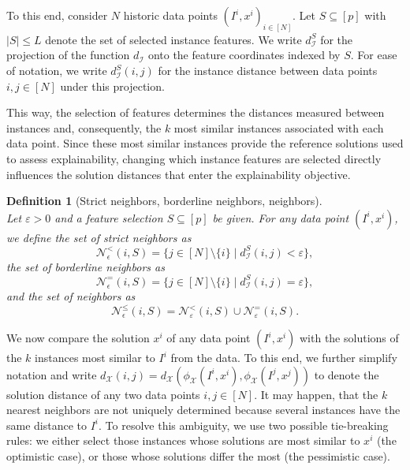 \documentclass[11pt, a4paper]{article}
\newtheorem{definition}{Definition}
\newcommand{\MHil}[1]{\todo[color=gray, textcolor=yellow, inline, author=MH]{#1}}
\newcommand{\I}{{\mathcal{I}}} %
\newcommand{\X}{{\mathcal{X}}} %
\newcommand{\instanceindex}{i}
\newcommand{\fsel}{S} %
\newcommand{\selectionset}{\fsel}
\newcommand{\neighbour}{\ensuremath{\mathcal{N}}}
\newcommand{\sEpsStrict}[1][(\instanceindex,\selectionset)]{\ensuremath{\neighbour^<_\epsilon#1}}
\newcommand{\sEpsBorder}[1][(\instanceindex,\selectionset)]{\ensuremath{\neighbour^=_\epsilon#1}}
\newcommand{\sEpsNeighbour}[1][(\instanceindex,\selectionset)]{\ensuremath{\neighbour^\le_\epsilon#1}}
\newcommand{\sEps}[1][(\instanceindex,\selectionset)]{\ensuremath{\neighbour_\epsilon#1}}
\begin{document}
To this end, consider $N$ historic data points $(I^i, x^i)_{i \in [N]}$. Let $\selectionset \subseteq [p]$ with $|\selectionset| \leq L$ denote the set of selected instance features. We write $d_{\mathcal{I}}^{\selectionset}$ for the projection of the function $d_{\mathcal{I}}$ onto the feature coordinates indexed by $\selectionset$. For ease of notation, we write $d_\I^{\selectionset}(i,j)$  for the instance distance between data points $i,j \in [N]$ under this projection.


This way, the selection of features determines the distances measured between instances and, consequently, the $k$ most similar instances associated with each data point. Since these most similar instances provide the reference solutions used to assess explainability, changing which instance features are selected directly influences the solution distances that enter the explainability objective.


\begin{definition}[Strict neighbors, borderline neighbors, neighbors]~\\
Let $\varepsilon > 0$ and a feature selection $\selectionset \subseteq [p]$ be given.
For any data point $(I^i, x^i)$, we define the set of \emph{strict neighbors} as
\[
\sEpsStrict
  = \{ j \in [N] \setminus \{i\} \mid d_{\mathcal{I}}^{\selectionset}(i,j) < \varepsilon \},
\]
the set of \emph{borderline neighbors} as
\[
\sEpsBorder
  = \{ j \in [N] \setminus \{i\} \mid d_{\mathcal{I}}^{\selectionset}(i,j) = \varepsilon \},
\]
and the set of \emph{neighbors} as
\[
\sEpsNeighbour
  = \mathcal{N}^{<}_{\varepsilon}(i,\selectionset) \cup \mathcal{N}^{=}_{\varepsilon}(i,\selectionset).
\]
\end{definition}



We now compare the solution $x^i$ of any data point $(I^i, x^i)$ with the solutions of the $k$ instances most similar to $I^i$ from the data. To this end, we further simplify notation and write $d_\X(i,j) = d_\X(\phi_\X(I^i,x^i),\phi_\X(I^j,x^j))$ to denote the solution distance of any two data points $i,j\in [N]$.
 It may happen, that the $k$ nearest neighbors are not uniquely determined because several instances have the same distance to $I^i$. To resolve this ambiguity, we use two possible tie-breaking rules: we either select those instances whose solutions are most similar to $x^i$ (the optimistic case), or those whose solutions differ the most (the pessimistic case).
\end{document}
